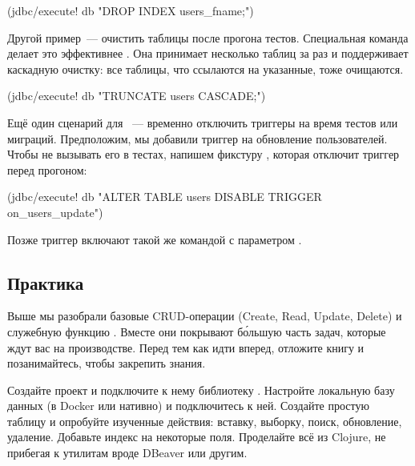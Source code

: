 \begin{english}
  \begin{clojure}
(jdbc/execute! db "DROP INDEX users_fname;")
  \end{clojure}
\end{english}


Другой пример~--- очистить таблицы после прогона тестов. Специальная команда  делает это эффективнее . Она принимает несколько таблиц за раз и поддерживает каскадную очистку: все таблицы, что ссылаются на указанные, тоже очищаются.

\begin{english}
  \begin{clojure}
(jdbc/execute! db "TRUNCATE users CASCADE;")
  \end{clojure}
\end{english}

Ещё один сценарий для ~--- временно отключить триггеры на время тестов или миграций. Предположим, мы добавили триггер на обновление пользователей. Чтобы не вызывать его в тестах, напишем фикстуру , которая отключит триггер перед прогоном:

\begin{english}
  \begin{clojure}
(jdbc/execute! db
  "ALTER TABLE users DISABLE TRIGGER on_users_update")
  \end{clojure}
\end{english}

Позже триггер включают такой же командой с параметром .

\subsection{Практика}

Выше мы разобрали базовые CRUD-операции (Create, Read, Update, Delete) и служебную функцию . Вместе они покрывают б\'{о}льшую часть задач, которые ждут вас на производстве. Перед тем как идти вперед, отложите книгу и позанимайтесь, чтобы закрепить знания.

Создайте проект и подключите к нему библиотеку . Настройте локальную базу данных (в Docker или нативно) и подключитесь к ней. Создайте простую таблицу и опробуйте изученные действия: вставку, выборку, поиск, обновление, удаление. Добавьте индекс на некоторые поля. Проделайте всё из Clojure, не прибегая к утилитам вроде DBeaver или другим.


